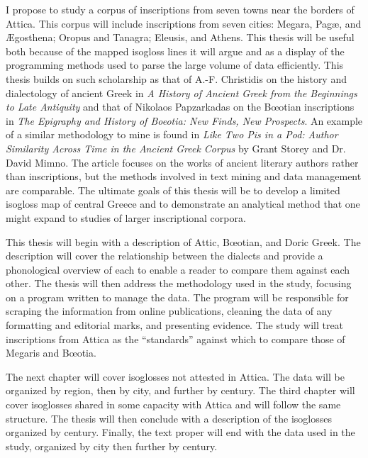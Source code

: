 \documentclass{turabian-researchpaper}
\begin{document}
\maketitle

I propose to study a corpus of inscriptions from seven towns near the borders of Attica. This corpus will include inscriptions from seven cities: Megara, Pagæ, and Ægosthena; Oropus and Tanagra; Eleusis, and Athens. This thesis will be useful both because of the mapped isogloss lines it will argue and as a display of the programming methods used to parse the large volume of data efficiently. This thesis builds on such scholarship as that of A.-F. Christidis on the history and dialectology of ancient Greek in \textit{A History of Ancient Greek from the Beginnings to Late Antiquity} and that of Nikolaos Papzarkadas on the Bœotian inscriptions in \textit{The Epigraphy and History of Boeotia: New Finds, New Prospects}. An example of a similar methodology to mine is found in \textit{Like Two Pis in a Pod: Author Similarity Across Time in the Ancient Greek Corpus} by Grant Storey and Dr. David Mimno. The article focuses on the works of ancient literary authors rather than inscriptions, but the methods involved in text mining and data management are comparable. The ultimate goals of this thesis will be to develop a limited isogloss map of central Greece and to demonstrate an analytical method that one might expand to studies of larger inscriptional corpora.

This thesis will begin with a description of Attic, Bœotian, and Doric Greek. The description will cover the relationship between the dialects and provide a phonological overview of each to enable a reader to compare them against each other. The thesis will then address the methodology used in the study, focusing on a program written to manage the data. The program will be responsible for scraping the information from online publications, cleaning the data of any formatting and editorial marks, and presenting evidence. The study will treat inscriptions from Attica as the ``standards'' against which to compare those of Megaris and Bœotia.

The next chapter will cover isoglosses not attested in Attica. The data will be organized by region, then by city, and further by century. The third chapter will cover isoglosses shared in some capacity with Attica and will follow the same structure. The thesis will then conclude with a description of the isoglosses organized by century. Finally, the text proper will end with the data used in the study, organized by city then further by century.


\clearpage
\nocite{*}
\printbibliography
\end{document}
